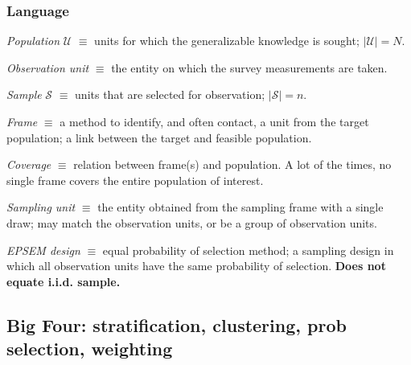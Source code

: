 \documentclass{beamer}
\begin{document}
\begin{frame}\frametitle{Language}

\textit{Population} $\mathcal U$ $\equiv$ units for which the generalizable knowledge is sought; $|\mathcal{U}|=N$.

\smallskip

\textit{Observation unit} $\equiv$ the entity on which the survey measurements are
taken.

\smallskip

\textit{Sample} $\mathcal S$ $\equiv$ units that are selected for observation; $|\mathcal{S}|=n$.

\smallskip

\textit{Frame} $\equiv$ a method to identify, and often contact, a unit from the target population; a link between the target and feasible population.

\smallskip

\textit{Coverage} $\equiv$ relation between frame(s) and population.
A lot of the times, no single frame covers the entire population of interest.

\smallskip

\textit{Sampling unit} $\equiv$ the entity obtained from the sampling frame
with a single draw;
may match the observation units, or be a group of observation units.

\smallskip

\textit{EPSEM design} $\equiv$ equal probability of selection method; a sampling
design in which all observation units have the same probability of selection.
\textbf{Does not equate i.i.d. sample.}

\end{frame}

\subsection{Big Four: stratification, clustering, prob selection, weighting}
\end{document}

